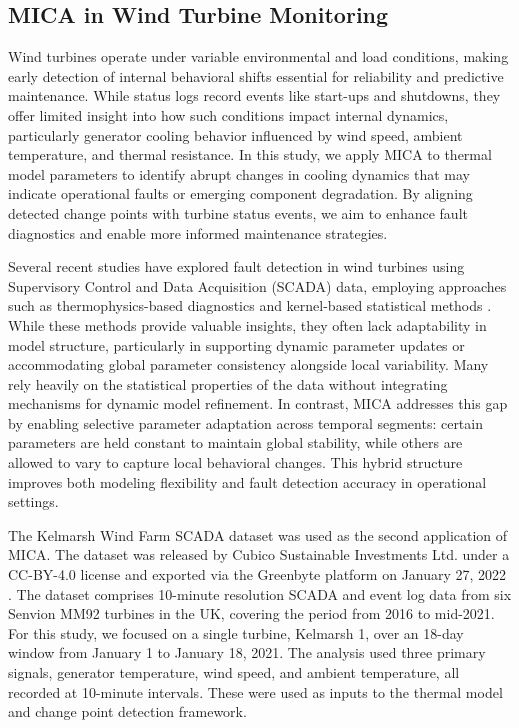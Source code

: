 \documentclass[10pt,letterpaper]{article}
\begin{document}
\subsection*{MICA in Wind Turbine Monitoring}
Wind turbines operate under variable environmental and load conditions, making early detection of internal behavioral shifts essential for reliability and predictive maintenance. While status logs record events like start-ups and shutdowns, they offer limited insight into how such conditions impact internal dynamics, particularly generator cooling behavior influenced by wind speed, ambient temperature, and thermal resistance. In this study, we apply MICA to thermal model parameters to identify abrupt changes in cooling dynamics that may indicate operational faults or emerging component degradation. By aligning detected change points with turbine status events, we aim to enhance fault diagnostics and enable more informed maintenance strategies.


Several recent studies have explored fault detection in wind turbines using Supervisory Control and Data Acquisition (SCADA) data, employing approaches such as thermophysics-based diagnostics and kernel-based statistical methods \cite{qiu2016applying, letzgus2020change, huang2023dynamic}. While these methods provide valuable insights, they often lack adaptability in model structure, particularly in supporting dynamic parameter updates or accommodating global parameter consistency alongside local variability. Many rely heavily on the statistical properties of the data without integrating mechanisms for dynamic model refinement. In contrast, MICA addresses this gap by enabling selective parameter adaptation across temporal segments: certain parameters are held constant to maintain global stability, while others are allowed to vary to capture local behavioral changes. This hybrid structure improves both modeling flexibility and fault detection accuracy in operational settings.

The Kelmarsh Wind Farm SCADA dataset was used as the second application of
MICA. The dataset was released by Cubico Sustainable Investments Ltd. under a CC-BY-4.0 license and exported via the Greenbyte platform on January 27, 2022 \cite{SCADA_Data}. The dataset comprises 10-minute resolution SCADA and event log data from six Senvion MM92 turbines in the UK, covering the period from 2016 to mid-2021. For this study, we focused on a single turbine, Kelmarsh 1, over an 18-day window from January 1 to January 18, 2021. The analysis used three primary signals, generator temperature, wind speed, and ambient temperature, all recorded at 10-minute intervals. These were used as inputs to the thermal model and change point detection framework.
\end{document}
